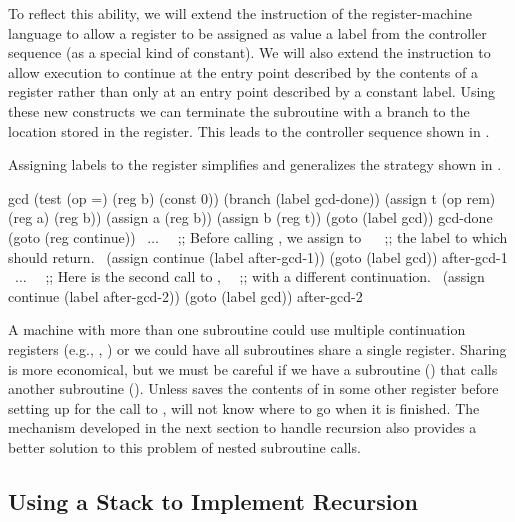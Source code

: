To reflect this ability, we will extend the  instruction of the
register-machine language to allow a register to be assigned as value a label
from the controller sequence (as a special kind of constant).  We will also
extend the  instruction to allow execution to continue at the entry
point described by the contents of a register rather than only at an entry
point described by a constant label.  Using these new constructs we can
terminate the  subroutine with a branch to the location stored in the
 register.  This leads to the controller sequence shown in
.

\begin{codeFigure}
  {%
    Assigning labels to the  register simplifies and generalizes
    the strategy shown in .
  }%
\begin{codeBlock}
gcd
 (test (op =) (reg b) (const 0))
 (branch (label gcd-done))
 (assign t (op rem) (reg a) (reg b))
 (assign a (reg b))
 (assign b (reg t))
 (goto (label gcd))
gcd-done
 (goto (reg continue))
   ~\( \dots \)~
 ~\textrm{;; Before calling , we assign to }~
 ~\textrm{;; the label to which  should return.}~
 (assign continue (label after-gcd-1))
 (goto (label gcd))
after-gcd-1
   ~\( \dots \)~
 ~\textrm{;; Here is the second call to ,}~
 ~\textrm{;; with a different continuation.}~
 (assign continue (label after-gcd-2))
 (goto (label gcd))
after-gcd-2
\end{codeBlock}
\end{codeFigure}

\noindent
A machine with more than one subroutine could use multiple continuation
registers (e.g., , ) or we could
have all subroutines share a single  register.  Sharing is more
economical, but we must be careful if we have a subroutine () that
calls another subroutine ().  Unless  saves the contents
of  in some other register before setting up  for
the call to ,  will not know where to go when it is
finished.  The mechanism developed in the next section to handle recursion also
provides a better solution to this problem of nested subroutine calls.

\subsection{Using a Stack to Implement Recursion}
\label{Section 5.1.4}

